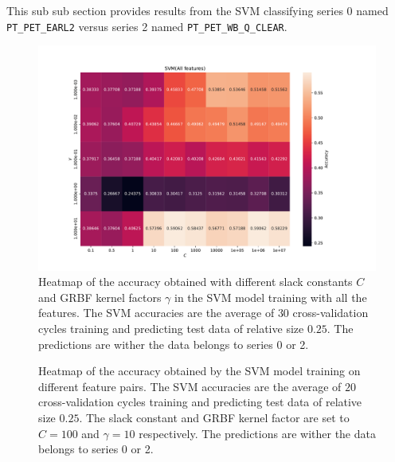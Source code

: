 This sub sub section provides results from the SVM classifying series 0 named \verb|PT_PET_EARL2|
versus series 2 named \verb|PT_PET_WB_Q_CLEAR|. 

\begin{figure}[H]
\centering
\includegraphics[width=1\textwidth]{Figures/accuracy(C,gamma)1}
\caption{Heatmap of the accuracy obtained with different slack constants $C$ and 
GRBF kernel factors $\gamma $ in the SVM model training with all the features. The SVM accuracies are the average of $30$ cross-validation 
cycles training and predicting test data of relative size $0.25$.
 The predictions are wither the data belongs to series 0 or 2.}

\label{fig:Figures-accuracy-C-gamma-1}
\end{figure}

\begin{figure}[H]
\centering
{}
\caption{Heatmap of the accuracy obtained by the SVM model training on different feature pairs. The SVM accuracies are the average 
of $20$ cross-validation cycles training and predicting test data of relative size $0.25$.
The slack constant and GRBF kernel factor are set to $C=100$ and $\gamma=10 $ respectively. 
 The predictions are wither the data belongs to series 0 or 2.}
\label{fig:Figures-feature_pairs1}
\end{figure}

